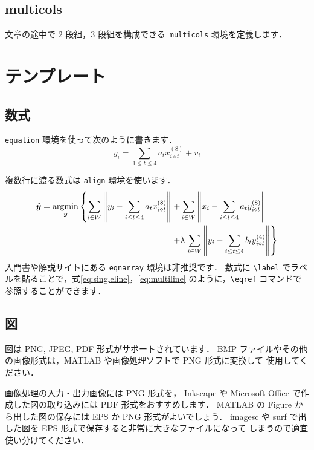 \documentclass[dvipdfmx,report,disablejfam,nosetpagesize,12pt]{jsbook}
\begin{document}
\subsection*{multicols}
文章の途中で 2 段組，3 段組を構成できる\ \verb+multicols+ 環境を定義します．

\section{テンプレート}

\subsection{数式}
\verb+equation+ 環境を使って次のように書きます．
\begin{equation}
   y_i = \sum_{1\leq t\leq 4} a_t x_{i\diamond t}^{(8)} + v_i
   \label{eq:singleline}
\end{equation}

複数行に渡る数式は \verb+align+ 環境を使います．
\begin{align}
   \hat{\bm{y}} = \argmin_{\bm{y}}
   \left\{
      \sum_{i\in W}
         \left\|
            y_i - \sum_{i\leq t\leq 4} a_t x_{i\diamond t}^{(8)}
         \right\|
   \right.
   + &          %
      \sum_{i\in W}
         \left\|
            x_i - \sum_{i\leq t\leq 4} a_t y_{i\diamond t}^{(8)}
         \right\|
   \nonumber \\ %
   + &
   \lambda  
   \left.
      \sum_{i\in W}
         \left\|
            y_i - \sum_{i\leq t\leq 4} b_t y_{i\diamond t}^{(4)}
         \right\|
   \right\}
   \label{eq:multiline}
\end{align}
入門書や解説サイトにある \verb+eqnarray+ 環境は非推奨です．
数式に \verb+\label+ でラベルを貼ることで，式\eqref{eq:singleline}，\eqref{eq:multiline}
のように，\verb+\eqref+ コマンドで参照することができます．

\subsection{図}
\label{Sec.basis.fig}
図は PNG, JPEG, PDF 形式がサポートされています．
BMP ファイルやその他の画像形式は，MATLAB や画像処理ソフトで PNG 形式に変換して
使用してください．


画像処理の入力・出力画像には PNG 形式を，
Inkscape や Microsoft Office で作成した図の取り込みには PDF 形式をおすすめします．
MATLAB の Figure から出した図の保存には EPS か PNG 形式がよいでしょう．
imagesc や surf で出した図を EPS 形式で保存すると非常に大きなファイルになって
しまうので適宜使い分けてください．
\end{document}
